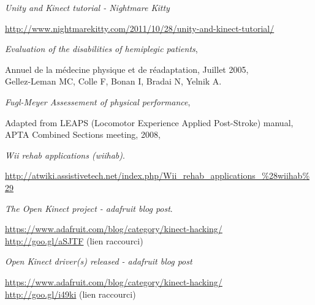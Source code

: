 \begin{thebibliography}{9}


  \emph{Unity and Kinect tutorial - Nightmare Kitty}\\
  \begin{small}
  \url{http://www.nightmarekitty.com/2011/10/28/unity-and-kinect-tutorial/}
  \end{small}

  \emph{Evaluation of the disabilities of hemiplegic patients},\\
  \begin{small}
  Annuel de la médecine physique et de réadaptation, Juillet 2005,\\
  Gellez-Leman MC, Colle F, Bonan I, Bradai N, Yelnik A.\\
  \end{small}
  
  \emph{Fugl-Meyer Assessement of physical performance},\\
  \begin{small}
  Adapted from LEAPS (Locomotor Experience Applied Post-Stroke) manual,\\
  APTA Combined Sections meeting, 2008,\\
  \end{small}

  \emph{Wii rehab applications (wiihab)}.\\
  \begin{small}
  \url{http://atwiki.assistivetech.net/index.php/Wii_rehab_applications_\%28wiihab\%29}
  \end{small}
  
  \emph{The Open Kinect project - adafruit blog post}. \\
  \begin{small}
  \url{https://www.adafruit.com/blog/category/kinect-hacking/}\\
  \url{http://goo.gl/aSJTF} (lien raccourci)
  \end{small}

  \emph{Open Kinect driver(s) released - adafruit blog post}\\
  \begin{small}
  \url{https://www.adafruit.com/blog/category/kinect-hacking/}\\
  \url{http://goo.gl/i49ki} (lien raccourci)
  \end{small}


\end{thebibliography}
